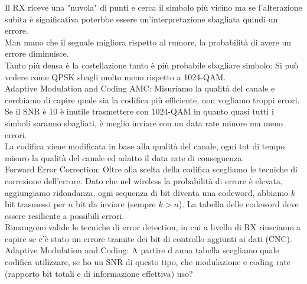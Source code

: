 Il RX riceve una "nuvola" di punti e cerca il simbolo più vicino ma se l'alterazione subita è significativa poterbbe essere un'interpretazione sbagliata quindi un errore.\\
Man mano che il segnale migliora rispetto al rumore, la probabilità di avere un errore diminuisce.\\
Tanto più densa è la costellazione tanto è più probabile sbagliare simbolo:
Si può vedere come QPSK sbagli molto meno rispetto a 1024-QAM.\\

Adaptive Modulation and Coding AMC: Misuriamo la qualità del canale e cerchiamo di capire quale sia la codifica più efficiente, non vogliamo troppi errori. Se il SNR è 10 è inutile trasmettere con 1024-QAM in quanto quasi tutti i simboli saranno sbagliati, è meglio inviare con un data rate minore ma meno errori. \\
La codifica viene modificata in base alla qualità del canale, ogni tot di tempo misuro la qualità del canale ed adatto il data rate di conseguenza.\\

Forward Error Correction: Oltre alla scelta della codifica scegliamo le tecniche di correzione dell'errore. 
Dato che nel wireless la probabilità di errore è elevata, aggiungiamo ridondanza, ogni sequenza di bit diventa una codeword, abbiamo $k$ bit trasmessi per $n$ bit da inviare (sempre $k>n$). La tabella delle codeword deve essere resiliente a possibili errori.\\
Rimangono valide le tecniche di error detection, in cui a livello di RX riusciamo a capire se c'è stato un errore tramite dei bit di controllo aggiunti ai dati (CNC).\\

Adaptive Modulation and Coding: 
A partire d auna tabella scegliamo quale codifica utilizzare, se ho un SNR di questo tipo, che modulazione e coding rate (rapporto bit totali e di informazione effettiva) uso? 
